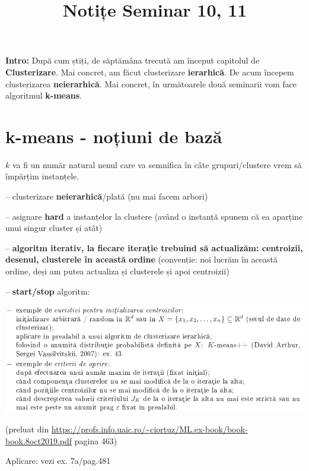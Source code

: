 \documentclass[12pt]{article}
\title{%
	\textbf{Notițe Seminar 10, 11}}
\begin{document}
	
	\maketitle
	
	\textbf{{Intro:}} După cum știți, de săptămâna trecută am început capitolul de \textbf{Clusterizare}. Mai concret, am făcut clusterizare \textbf{ierarhică}. De acum începem clusterizarea \textbf{neierarhică}. Mai concret, în următoarele două seminarii vom face algoritmul \textbf{k-means}.
	
	\section{k-means - noțiuni de bază}
	
	$k$ va fi un număr natural nenul care va semnifica în câte grupuri/clustere vrem să împărțim instanțele.
	
	-- clusterizare \textbf{neierarhică}/plată (nu mai facem arbori)
	
	-- asignare \textbf{hard} a instanțelor la clustere (având o instanță spunem că ea aparține unui singur cluster și atât)
	
	-- \textbf{algoritm iterativ, la fiecare iterație trebuind să actualizăm: centroizii, desenul, clusterele în această ordine} (convenție: noi lucrăm în această ordine, deși am putea actualiza și clusterele și apoi centroizii)
	
	-- \textbf{start/stop} algoritm:
	\begin{center}
		\includegraphics[width=0.8\linewidth]{screenshot001}
	\end{center}
	(preluat din \url{https://profs.info.uaic.ro/~ciortuz/ML.ex-book/book-book.8oct2019.pdf} pagina 463)
	
	Aplicare: vezi ex. 7a/pag.481 
	
\end{document}
